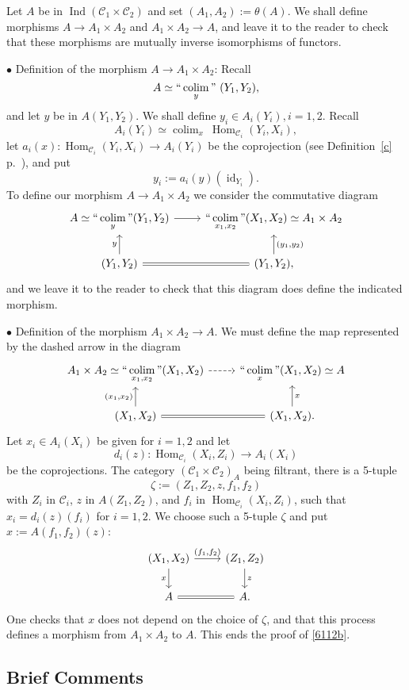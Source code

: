 \documentclass[12pt]{article}%
\theoremstyle{remark}
\theoremstyle{definition}
\newcommand{\bu}{\bullet}
\newcommand{\nn}{\noindent}
\newcommand{\C}{\mathcal C}
\DeclareMathOperator*{\colim}{colim}
\DeclareMathOperator*{\ic}{``\colim"}
\DeclareMathOperator{\id}{id}
\DeclareMathOperator{\Hom}{Hom}%
\DeclareMathOperator{\Ind}{Ind}
\begin{document}
Let $A$ be in $\Ind(\C_1\times\C_2)$ and set $(A_1,A_2):=\theta(A)$. We shall define morphisms $A\to A_1\times A_2$ and $A_1\times A_2\to A$, and leave it to the reader to check that these morphisms are mutually inverse isomorphisms of functors. 

\nn$\bu$ Definition of the morphism $A\to A_1\times A_2$: Recall 
$$
A\simeq\ic_y\ (Y_1,Y_2), 
$$ 
and let $y$ be in $A(Y_1,Y_2)$. We shall define $y_i\in A_i(Y_i),i=1,2$. Recall 
$$
A_i(Y_i)\simeq\colim_x\ \Hom_{\C_i}(Y_i,X_i), 
$$ 
let $a_i(x):\Hom_{\C_i}(Y_i,X_i)\to A_i(Y_i)$ be the coprojection (see Definition~\ref{c} p.~\pageref{c}), and put 
$$
y_i:=a_i(y)(\id_{Y_i}). 
$$ 
To define our morphism $A\to A_1\times A_2$ we consider the commutative diagram
$$
\begin{tikzcd}
A\simeq\ds\ic_y(Y_1,Y_2)\ar{r}&\ds\ic_{x_1,x_2}(X_1,X_2)\simeq A_1\times A_2\\ 
(Y_1,Y_2)\ar{u}{y}\ar[equal]{r}&(Y_1,Y_2),\ar{u}[swap]{(y_1,y_2)}
\end{tikzcd}
$$ 
and we leave it to the reader to check that this diagram does define the indicated morphism.

\nn$\bu$ Definition of the morphism $A_1\times A_2\to A$. We must define the map represented by the dashed arrow in the diagram  
$$
\begin{tikzcd}
A_1\times A_2\simeq\ds\ic_{x_1,x_2}(X_1,X_2)\ar[dashed]{r}&\ds\ic_x(X_1,X_2)\simeq A\\ 
(X_1,X_2)\ar{u}{(x_1,x_2)}\ar[equal]{r}&(X_1,X_2).\ar{u}[swap]{x}
\end{tikzcd}
$$ 
Let $x_i\in A_i(X_i)$ be given for $i=1,2$ and let
$$
d_i(z):\Hom_{\C_i}(X_i,Z_i)\to A_i(X_i)
$$
be the coprojections. The category $(\C_1\times\C_2)_A$ being filtrant, there is a 5-tuple 
$$
\zeta:=(Z_1,Z_2,z,f_1,f_2)
$$ 
with $Z_i$ in $\C_i$, $z$ in $A(Z_1,Z_2)$, and $f_i$ in $\Hom_{\C_i}(X_i,Z_i)$, such that $x_i=d_i(z)(f_i)$ for $i=1,2$. We choose such a 5-tuple $\zeta$ and put $x:=A(f_1,f_2)(z)$:
$$
\begin{tikzcd}
(X_1,X_2)\ar{d}[swap]{x}\ar{r}{(f_1,f_2)}&(Z_1,Z_2)\ar{d}{z}\\ 
A\ar[equal]{r}&A.
\end{tikzcd}
$$ 
One checks that $x$ does not depend on the choice of $\zeta$, and that this process defines a morphism from $A_1\times A_2$ to $A$. This ends the proof of \eqref{6112b}.


\subsection{Brief Comments}
\end{document}
